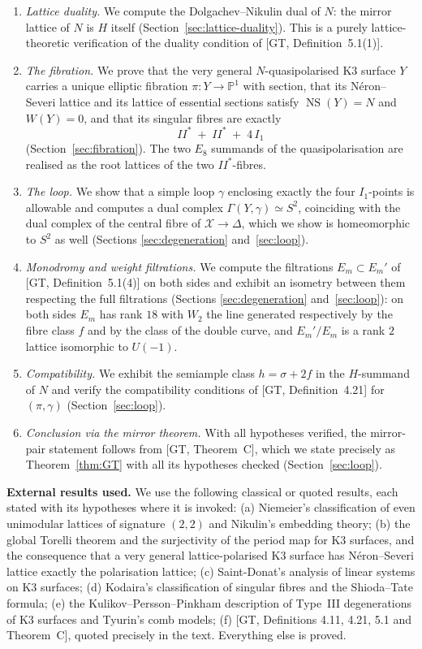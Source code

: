 \documentclass[11pt]{article}
\newcommand{\X}{\mathcal{X}}
\newcommand{\D}{\Delta}
\newcommand{\PP}{\mathbb{P}}
\DeclareMathOperator{\NS}{NS}
\begin{document}
\begin{enumerate}[label=(\arabic*),leftmargin=2.2em]
\item \emph{Lattice duality.} We compute the Dolgachev--Nikulin dual of $N$:
the mirror lattice of $N$ is $H$ itself
(Section~\ref{sec:lattice-duality}). This is a purely lattice-theoretic
verification of the duality condition of [GT, Definition~5.1(1)].
\item \emph{The fibration.} We prove that the very general
$N$-quasipolarised K3 surface $Y$ carries a unique elliptic fibration
$\pi\colon Y\to\PP^1$ with section, that its N\'eron--Severi lattice and its
lattice of essential sections satisfy $\NS(Y)=N$ and $W(Y)=0$, and that its
singular fibres are exactly
\[
II^* \;+\; II^* \;+\; 4\,I_1
\]
(Section~\ref{sec:fibration}). The two $E_8$ summands of the
quasipolarisation are realised as the root lattices of the two
$II^*$-fibres.
\item \emph{The loop.} We show that a simple loop $\gamma$ enclosing exactly
the four $I_1$-points is allowable and computes a dual complex
$\Gamma(Y,\gamma)\simeq S^2$, coinciding with the dual complex of the
central fibre of $\X\to\D$, which we show is homeomorphic to $S^2$ as well
(Sections \ref{sec:degeneration} and~\ref{sec:loop}).
\item \emph{Monodromy and weight filtrations.} We compute the filtrations
$E_m\subset E_m'$ of [GT, Definition~5.1(4)] on both sides and exhibit an
isometry between them respecting the full filtrations
(Sections \ref{sec:degeneration} and~\ref{sec:loop}): on both sides
$E_m$ has rank $18$ with $W_2$ the line generated respectively by the fibre
class $f$ and by the class of the double curve, and $E_m'/E_m$ is a rank
$2$ lattice isomorphic to $U(-1)$.
\item \emph{Compatibility.} We exhibit the semiample class $h=\sigma+2f$ in
the $H$-summand of $N$ and verify the compatibility conditions of [GT,
Definition~4.21] for $(\pi,\gamma)$ (Section~\ref{sec:loop}).
\item \emph{Conclusion via the mirror theorem.} With all hypotheses
verified, the mirror-pair statement follows from [GT, Theorem~C], which we
state precisely as Theorem~\ref{thm:GT} with all its hypotheses checked
(Section~\ref{sec:loop}).
\end{enumerate}

\medskip

\noindent\textbf{External results used.} We use the following classical or
quoted results, each stated with its hypotheses where it is invoked:
(a) Niemeier's classification of even unimodular lattices of signature
$(2,2)$ and Nikulin's embedding theory; (b) the global Torelli theorem and
the surjectivity of the period map for K3 surfaces, and the consequence
that a very general lattice-polarised K3 surface has N\'eron--Severi lattice
exactly the polarisation lattice; (c) Saint-Donat's analysis of linear
systems on K3 surfaces; (d) Kodaira's classification of singular fibres and
the Shioda--Tate formula; (e) the Kulikov--Persson--Pinkham description of
Type~III degenerations of K3 surfaces and Tyurin's comb models; (f)
[GT, Definitions 4.11, 4.21, 5.1 and Theorem~C], quoted precisely in the
text. Everything else is proved.
\end{document}

